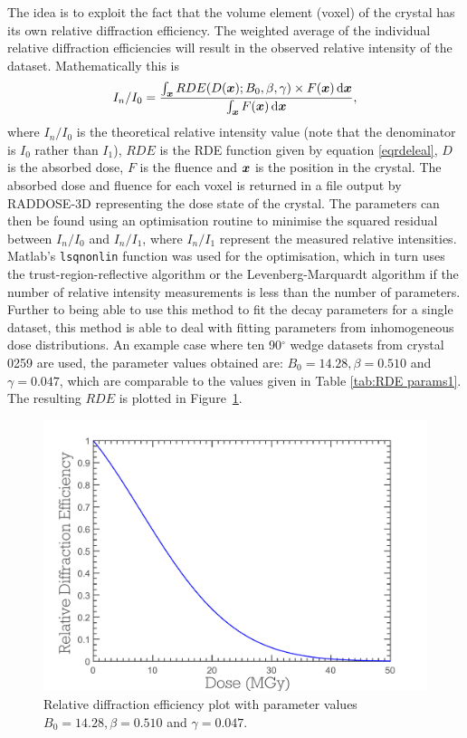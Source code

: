 The idea is to exploit the fact that the volume element (voxel) of the crystal has its own relative diffraction efficiency.
The weighted average of the individual relative diffraction efficiencies will result in the observed relative intensity of the dataset.
Mathematically this is
\begin{equation}
    I_n/I_0 = \frac{\int_{\boldsymbol{x}} RDE(D(\boldsymbol{x}); B_0, \beta, \gamma) \times F(\boldsymbol{x})\,\mathrm{d}\boldsymbol{x}}{\int_{\boldsymbol{x}} F(\boldsymbol{x})\,\mathrm{d}\boldsymbol{x}},
\end{equation}
where $I_n/I_0$ is the theoretical relative intensity value (note that the denominator is $I_0$ rather than $I_1$), $RDE$ is the RDE function given by equation \ref{eqrdeleal}, $D$ is the absorbed dose, $F$ is the fluence and $\boldsymbol{x}$ is the position in the crystal.
The absorbed dose and fluence for each voxel is returned in a file output by RADDOSE-3D representing the dose state of the crystal.
The parameters can then be found using an optimisation routine to minimise the squared residual between $I_n/I_0$ and $I_n/I_1$, where $I_n/I_1$ represent the measured relative intensities.
Matlab's \verb+lsqnonlin+ function was used for the optimisation, which in turn uses the trust-region-reflective algorithm \cite{coleman1996} or the Levenberg-Marquardt algorithm \cite{more1978levenberg} if the number of relative intensity measurements is less than the number of parameters.
Further to being able to use this method to fit the decay parameters for a single dataset, this method is able to deal with fitting parameters from inhomogeneous dose distributions.
An example case where ten 90$^{\circ}$ wedge datasets from crystal 0259 are used, the parameter values obtained are: $B_0 = 14.28, \beta = 0.510$ and $\gamma = 0.047$, which are comparable to the values given in Table \ref{tab:RDE params1}.
The resulting $RDE$ is plotted in Figure~\ref{fig:Relative diffraction efficiency plot - ZDE}.
\begin{figure}
  \centering
    \includegraphics[width=1\textwidth]{figures/zde/RDEPlot_zde.pdf}
    \caption{Relative diffraction efficiency plot with parameter values $B_0 = 14.28, \beta = 0.510$ and $\gamma = 0.047$.}
    \label{fig:Relative diffraction efficiency plot - ZDE}
\end{figure}

